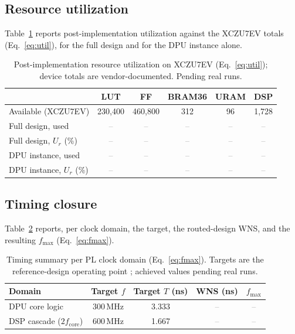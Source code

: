 \documentclass[onecolumn,journal]{IEEEtran}
\newcommand{\tbd}{\textcolor{gray}{--}}
\newcommand{\fmax}{f_{\mathrm{max}}}
\begin{document}
\subsection{Resource utilization}
Table~\ref{tab:resources} reports post-implementation utilization against the XCZU7EV
totals (Eq.~\eqref{eq:util}), for the full design and for the DPU instance alone.

\begin{table}[t]
\centering
\caption{Post-implementation resource utilization on XCZU7EV
(Eq.~\eqref{eq:util}); device totals are vendor-documented. Pending real runs.}
\label{tab:resources}
\renewcommand{\arraystretch}{1.2}
\begin{tabular}{lccccc}
\toprule
 & LUT & FF & BRAM36 & URAM & DSP\\
\midrule
Available (XCZU7EV) & 230{,}400 & 460{,}800 & 312 & 96 & 1{,}728\\
Full design, used   & \tbd & \tbd & \tbd & \tbd & \tbd\\
Full design, $U_r$ (\%) & \tbd & \tbd & \tbd & \tbd & \tbd\\
DPU instance, used  & \tbd & \tbd & \tbd & \tbd & \tbd\\
DPU instance, $U_r$ (\%) & \tbd & \tbd & \tbd & \tbd & \tbd\\
\bottomrule
\end{tabular}
\end{table}

\subsection{Timing closure}
Table~\ref{tab:timing} reports, per clock domain, the target, the routed-design WNS,
and the resulting $\fmax$ (Eq.~\eqref{eq:fmax}).

\begin{table}[t]
\centering
\caption{Timing summary per PL clock domain (Eq.~\eqref{eq:fmax}). Targets are the
reference-design operating point \cite{amd_pg338}; achieved values pending real runs.}
\label{tab:timing}
\renewcommand{\arraystretch}{1.2}
\begin{tabular}{lcccc}
\toprule
Domain & Target $f$ & Target $T$ (ns) & WNS (ns) & $\fmax$\\
\midrule
DPU core logic & 300\,MHz & 3.333 & \tbd & \tbd\\
DSP cascade ($2f_{\mathrm{core}}$) & 600\,MHz & 1.667 & \tbd & \tbd\\
\bottomrule
\end{tabular}
\end{table}
\end{document}
